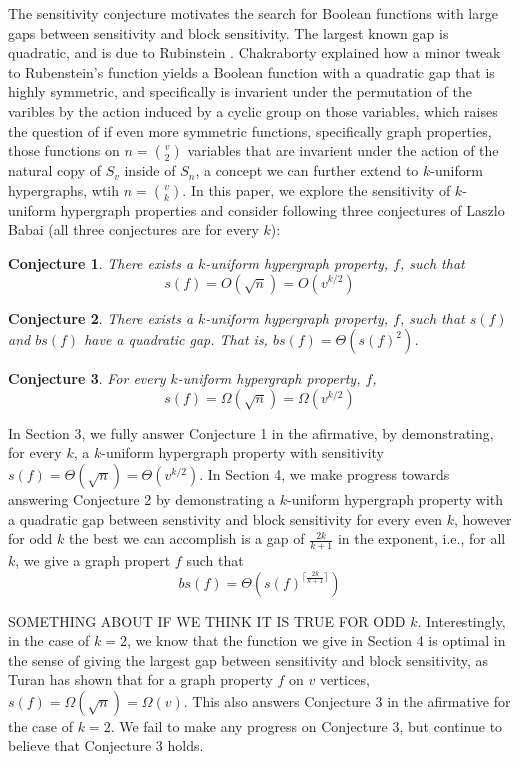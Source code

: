 \documentclass[psamsfonts]{amsart}
\newtheorem{conj}{Conjecture}
\theoremstyle{definition}
\theoremstyle{remark}
\numberwithin{equation}{section}
\begin{document}
The sensitivity conjecture motivates the search for Boolean functions with large gaps between sensitivity and block sensitivity. The largest known gap is quadratic, and is due to Rubinstein \cite{R}. Chakraborty \cite{C} explained how a minor tweak to Rubenstein's function yields a Boolean function with a quadratic gap that is highly symmetric, and specifically is invarient under the permutation of the varibles by the action induced by a cyclic group on those variables, which raises the question of if even more symmetric functions, specifically graph properties, those functions on $n={v\choose 2}$ variables that are invarient under the action of the natural copy of $S_v$ inside of $S_n$, a concept we can further extend to $k$-uniform hypergraphs, wtih $n={v\choose k}$. In this paper, we explore the sensitivity of $k$-uniform hypergraph properties and consider following three conjectures of Laszlo Babai (all three conjectures are for every $k$):

\begin{conj}
There exists a $k$-uniform hypergraph property, $f$, such that $$s(f)=O(\sqrt{n})=O(v^{k/2})$$
\end{conj}

\begin{conj}
There exists a $k$-uniform hypergraph property, $f$, such that $s(f)$ and $bs(f)$ have a quadratic gap. That is,  $bs(f)=\Theta(s(f)^2)$.
\end{conj}

\begin{conj}
For every $k$-uniform hypergraph property, $f$, $$s(f)=\Omega(\sqrt{n})=\Omega(v^{k/2})$$
\end{conj}

In Section 3, we fully answer Conjecture 1 in the afirmative, by demonstrating, for every $k$, a $k$-uniform hypergraph property with sensitivity $s(f)=\Theta(\sqrt{n})=\Theta(v^{k/2})$. In Section 4, we make progress towards answering Conjecture 2 by demonstrating a $k$-uniform hypergraph property with a quadratic gap between senstivity and block sensitivity for every even $k$, however for odd $k$ the best we can accomplish is a gap of $\frac{2k}{k+1}$ in the exponent, i.e., for all $k$, we give a graph propert $f$ such that 
$$bs(f)=\Theta(s(f)^{\lceil\frac{2k}{k+1}\rceil})$$

SOMETHING ABOUT IF WE THINK IT IS TRUE FOR ODD $k$. Interestingly, in the case of $k=2$, we know that the function we give in Section 4 is optimal in the sense of giving the largest gap between sensitivity and block sensitivity, as Turan \cite{T} has shown that for a graph property $f$ on $v$ vertices, $s(f) = \Omega(\sqrt{n})=\Omega(v)$. This also answers Conjecture 3 in the afirmative for the case of $k=2$. We fail to make any progress on Conjecture 3, but continue to believe that Conjecture 3 holds.
\end{document}

